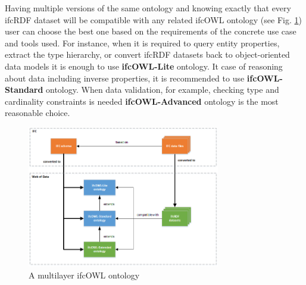 Having multiple versions of the same ontology and knowing exactly that every ifcRDF dataset will be compatible with any related ifcOWL ontology (see Fig. \ref{fig:ifcOWL-multilayered}) user can choose the best one based on the requirements of the concrete use case and tools used. For instance, when it is required to query entity properties, extract the type hierarchy, or convert ifcRDF datasets back to object-oriented data models it is enough to use \textbf{ifcOWL-Lite} ontology. It case of reasoning about data including inverse properties, it is recommended to use \textbf{ifcOWL-Standard} ontology. When data validation, for example, checking type and cardinality constraints is needed \textbf{ifcOWL-Advanced} ontology is the most reasonable choice.

\begin{figure}[h]
\centering
\includegraphics[width=0.75\textwidth]{images/ifcOWL-multilayer.png}
\caption{A multilayer ifcOWL ontology}
\label{fig:ifcOWL-multilayered}
\end{figure}


